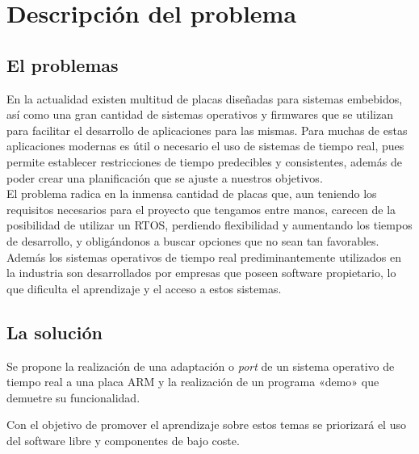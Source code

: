 \chapter{Descripción del problema}
\section{El problemas}
En la actualidad existen multitud de placas diseñadas para sistemas embebidos, así como una gran cantidad de sistemas operativos y firmwares que se utilizan para facilitar el desarrollo de aplicaciones para las mismas.
Para muchas de estas aplicaciones modernas es útil o necesario el uso de sistemas de tiempo real, pues permite establecer restricciones de tiempo predecibles y consistentes, además de poder crear una planificación que se ajuste a nuestros objetivos.\\

El problema radica en la inmensa cantidad de placas que, aun teniendo los requisitos necesarios para el proyecto que tengamos entre manos, carecen de la posibilidad de utilizar un RTOS, perdiendo flexibilidad y aumentando los tiempos de desarrollo, y obligándonos a buscar opciones que no sean tan favorables.
Además los sistemas operativos de tiempo real prediminantemente utilizados en la industria son desarrollados por empresas que poseen software propietario, lo que dificulta el aprendizaje y el acceso a estos sistemas.


\section{La solución}
Se propone la realización de una adaptación o \textit{port} de un sistema operativo de tiempo real a una placa ARM y la realización de un programa «demo» que demuetre su funcionalidad.

Con el objetivo de promover el aprendizaje sobre estos temas se priorizará el uso del software libre y componentes de bajo coste.
